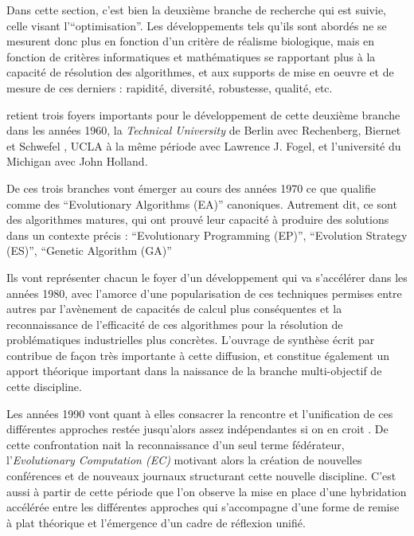 Dans cette section, c'est bien la deuxième branche de recherche qui est suivie, celle visant l'\enquote{optimisation}. Les développements tels qu'ils sont abordés ne se mesurent donc plus en fonction d'un critère de réalisme biologique, mais en fonction de critères informatiques et mathématiques se rapportant plus à la capacité de résolution des algorithmes, et aux supports de mise en oeuvre et de mesure de ces derniers : rapidité, diversité, robustesse, qualité, etc.

\textcite{DeJong2006a} retient trois foyers importants pour le développement de cette deuxième branche dans les années 1960, la \textit{Technical University} de Berlin avec Rechenberg, Biernet et Schwefel \autocite{Beyer2002}, UCLA à la même période avec Lawrence J. Fogel, et l'université du Michigan avec John Holland.

De ces trois branches vont émerger au cours des années 1970 ce que \textcite{DeJong2006a} qualifie comme des \foreignquote{english}{Evolutionary Algorithms (EA)} canoniques. Autrement dit, ce sont des algorithmes matures, qui ont prouvé leur capacité à produire des solutions dans un contexte précis : \foreignquote{english}{Evolutionary Programming (EP)}, \foreignquote{english}{Evolution Strategy (ES)}, \foreignquote{english}{Genetic Algorithm (GA)}

Ils vont représenter chacun le foyer d'un développement qui va s'accélérer dans les années 1980, avec l'amorce d'une popularisation de ces techniques permises entre autres par l'avènement de capacités de calcul plus conséquentes et la reconnaissance de l'efficacité de ces algorithmes pour la résolution de problématiques industrielles plus concrètes. L'ouvrage de synthèse écrit par \textcite{Goldberg1989} contribue de façon très importante à cette diffusion, et constitue également un apport théorique important dans la naissance de la branche multi-objectif de cette discipline.

Les années 1990 vont quant à elles consacrer la rencontre et l'unification de ces différentes approches restée jusqu'alors assez indépendantes si on en croit \textcite{DeJong2006a}. De cette confrontation nait la reconnaissance d'un seul terme fédérateur, l'\textit{Evolutionary Computation (EC)} motivant alors la création de nouvelles conférences et de nouveaux journaux structurant cette nouvelle discipline. C'est aussi à partir de cette période que l'on observe la mise en place d'une hybridation accélérée entre les différentes approches qui s'accompagne d'une forme de remise à plat théorique et l'émergence d'un cadre de réflexion unifié. \autocites[23-31]{DeJong2006a}{Back1997}

